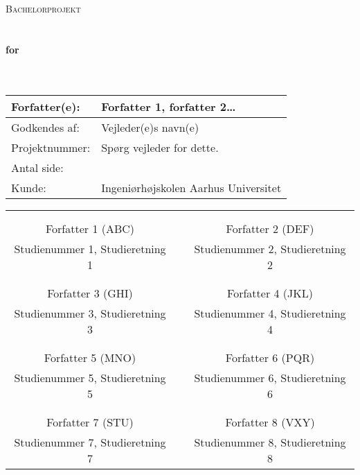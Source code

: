 \documentclass[Main]{subfiles}
\newcommand{\signature}{\underline{\qquad \qquad \qquad \qquad \qquad \qquad \qquad}}
\begin{document}
\begin{titlingpage}
\begin{center}

\textsc{\Large Bachelorprojekt}\\[0.25cm]


\HRule \\[0.4cm]

{ \huge \bfseries \DocumentType}\\[0.4cm]
{ \huge \bfseries for}\\[0.4cm] 
{ \huge \bfseries \ProjectName}\\[0.4cm]

\HRule \\[0.5cm]

\begin{tabular}{p{} | p{}}
\hline 
Forfatter(e): & Forfatter 1, forfatter 2\dots\\ 
\hline 
Godkendes af: & Vejleder(e)s navn(e) \\ 
\hline
Projektnummer: & Spørg vejleder for dette.\\
\hline
Antal side: & \pageref{LastPage} \\
\hline 
Kunde: & Ingeniørhøjskolen Aarhus Universitet \\
\hline
\end{tabular} 
\end{center}



\begin{tabular}{c p{} c}
&& \\
\signature & \quad & \signature  \\ 
Forfatter 1 (ABC) & & Forfatter 2 (DEF)\\
Studienummer 1, Studieretning 1 & & Studienummer 2, Studieretning 2 \\

&& \\
\signature & \quad & \signature  \\ 
Forfatter 3 (GHI)& & Forfatter 4 (JKL)\\
Studienummer 3, Studieretning 3 & & Studienummer 4, Studieretning 4\\

&& \\
\signature & \quad & \signature  \\ 
Forfatter 5 (MNO) & & Forfatter 6 (PQR)\\
Studienummer 5, Studieretning 5 & & Studienummer 6, Studieretning 6\\

&& \\
\signature & \quad & \signature  \\ 
Forfatter 7 (STU)& & Forfatter 8 (VXY)\\
Studienummer 7, Studieretning 7 & & Studienummer 8, Studieretning 8
\end{tabular} 

\end{titlingpage}
\end{document}
